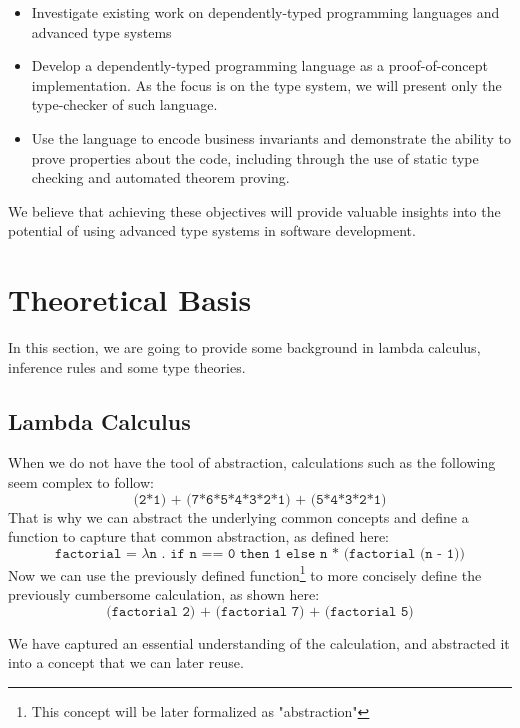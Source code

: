 \documentclass[12pt]{article}
\theoremstyle{definition}
\newcommand{\code}[1]{\texttt{#1}}
\begin{document}
\begin{itemize}
\item Investigate existing work on dependently-typed programming languages and advanced type systems
\item Develop a dependently-typed programming language as a proof-of-concept implementation. As the focus is on the type system, we will present only the type-checker of such language.
\item Use the language to encode business invariants and demonstrate the ability to prove properties about the code, including through the use of static type checking and automated theorem proving.
\end{itemize}

We believe that achieving these objectives will provide valuable insights into the potential of using advanced type systems in software development.

\section{Theoretical Basis}

In this section, we are going to provide some background in lambda calculus, inference rules and some type theories.

\subsection{Lambda Calculus}

When we do not have the tool of abstraction, calculations such as the following seem complex to follow:
\begin{equation*}
       \code{(2*1) + (7*6*5*4*3*2*1) + (5*4*3*2*1)}
\end{equation*}
That is why we can abstract the underlying common concepts and define a function to capture that common abstraction, as defined here:
\begin{equation*}
       \code{factorial = $\lambda$n . if n == 0 then 1 else n * (factorial (n - 1))}
\end{equation*}
Now we can use the previously defined function\footnote{This concept will be later formalized as "abstraction"} to more concisely define the previously cumbersome calculation, as shown here:
\begin{equation*}
       \code{(factorial 2) + (factorial 7) + (factorial 5)}
\end{equation*}

We have captured an essential understanding of the calculation, and abstracted it into a concept that we can later reuse.
\end{document}
